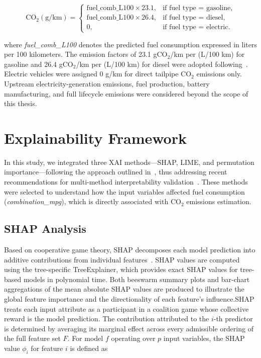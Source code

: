 \begin{equation}
\mathrm{CO}_2(\mathrm{g/km})=
\begin{cases}
\text{fuel\_comb\_L100}\times23.1, & \text{if fuel type = gasoline},\\
\text{fuel\_comb\_L100}\times26.4, & \text{if fuel type = diesel},\\
0, & \text{if fuel type = electric}.
\end{cases}
\label{eq:co2}
\end{equation}

where \textit{fuel\_comb\_L100} denotes the predicted fuel consumption expressed in liters per 100 kilometers. The emission factors of 23.1 gCO$_2$/km per (L/100 km) for gasoline and 26.4 gCO$_2$/km per (L/100 km) for diesel were adopted following~\cite{atique2026explainable}. Electric vehicles were assigned 0 g/km for direct tailpipe CO$_2$ emissions only. Upstream electricity-generation emissions, fuel production, battery manufacturing, and full lifecycle emissions were considered beyond the scope of this thesis.



\section{Explainability Framework}

In this study, we integrated three XAI methods---SHAP, LIME, and permutation importance---following the approach outlined in~\cite{atique2026explainable}, thus addressing recent recommendations for multi-method interpretability validation~\cite{ghadi2025explainable}\cite{yoo2025machine}. These methods were selected to understand how the input variables affected fuel consumption (\textit{combination\_mpg}), which is directly associated with CO$_2$ emissions estimation.

\subsection{SHAP Analysis}

Based on cooperative game theory, SHAP decomposes each model prediction into additive contributions from individual features~\cite{lundberg2017unified}. SHAP values are computed using the tree-specific TreeExplainer, which provides exact SHAP values for tree-based models in polynomial time. Both beeswarm summary plots and bar-chart aggregations of the mean absolute SHAP values are produced to illustrate the global feature importance and the directionality of each feature's influence.SHAP treats each input attribute as a participant in a coalition game whose collective reward is the model prediction. The contribution attributed to the $i$-th predictor is determined by averaging its marginal effect across every admissible ordering of the full feature set $F$. For model $f$ operating over $p$ input variables, the SHAP value $\phi_i$ for feature $i$ is defined as

